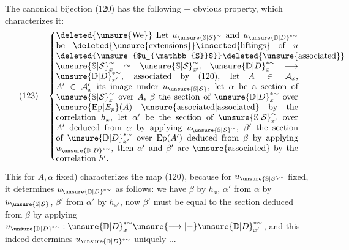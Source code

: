  The canonical bijection (120) has the following
$\pm$ obvious property, which characterizes it:
\[
(123)\quad\left\{\vcenter{\hbox{\begin{minipage}{0.82\linewidth}
\deleted{\unsure{We}} Let $u_{\unsure{\mathbb{S}|\mathcal{S}}^{\sim}}$ and
$u_{\unsure{\mathbb{D}|D}^{*\sim}}$ be
\deleted{\unsure{extensions}}\inserted{liftings} of $u$
\deleted{\unsure{$u_{\mathbb{S}}$}}\deleted{\unsure{associated}}
$\unsure{\mathbb{S}|\mathcal{S}}_x^{\sim}\simeq\unsure{\mathbb{S}|\mathcal{S}}_{x'}^{\sim}$,
$\unsure{\mathbb{D}|D}_x^{*\sim}\longrightarrow\unsure{\mathbb{D}|D}_{x'}^{*\sim}$,
associated by (120), let $A\in\mathcal{A}_x$,
$A'\in\mathcal{A}'_x$ its image under
$u_{\unsure{\mathbb{S}|\mathcal{S}}}$, let $\alpha$ be a section of $\unsure{\mathbb{S}|\mathcal{S}}_x^{\sim}$ over $A$,
$\beta$ the section of $\unsure{\mathbb{D}|D}_x^{*\sim}$ over
$\unsure{\mathrm{Ep}|E_p}(A)$ \unsure{associated|associated} by the correlation
$h_x$, let $\alpha'$ be the section of $\unsure{\mathbb{S}|\mathcal{S}}_{x'}^{\sim}$ over $A'$
deduced from $\alpha$ by applying $u_{\unsure{\mathbb{S}|\mathcal{S}}^{\sim}}$,
$\beta'$ the section of $\unsure{\mathbb{D}|D}_{x'}^{*\sim}$ over
$\mathrm{Ep}(A')$ deduced from $\beta$ by applying
$u_{\unsure{\mathbb{D}|D}^{*\sim}}$, then $\alpha'$ and $\beta'$ are
\unsure{associated} by the correlation $h'$.
\end{minipage}}}\right.
\]



This  \unsure{(}for $A,\alpha$ fixed)
characterizes the map  (120), because for
$u_{\unsure{\mathbb{S}|\mathcal{S}}^{\sim}}$ fixed, it determines $u_{\unsure{\mathbb{D}|D}^{*\sim}}$ as follows:
we have $\beta$ by $h_x$, $\alpha'$  from $\alpha$ by
$u_{\unsure{\mathbb{S}|\mathcal{S}}}$, $\beta'$  from $\alpha'$ by $h_{x'}$,
now $\beta'$ must be equal to the section deduced from $\beta$ by applying
$u_{\unsure{\mathbb{D}|D}^{*\sim}}:\unsure{\mathbb{D}|D}_x^{*\sim}
\unsure{\longrightarrow|-}\unsure{\mathbb{D}|D}_{x'}^{*\sim}$,
and this indeed determines $u_{\unsure{\mathbb{D}|D}^{*\sim}}$ uniquely ...

